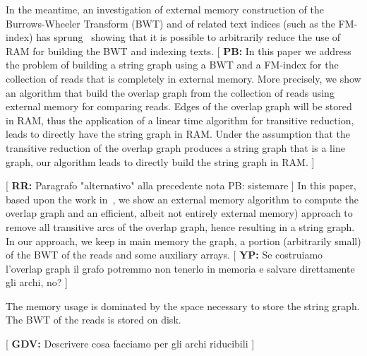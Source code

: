 \documentclass[runningheads,envcountsame,a4paper]{llncs}
\newcommand{\notaestesa}[2]{%
 \marginpar{\color{red!75!black}\textbf{\texttimes}}%
 {\color{red!75!black}%
 [\,\textbullet\,\textsf{\textbf{#1:}} %
 \textsf{\footnotesize#2}\,\textbullet\,]}%
}
\newcommand{\YP}[1]{\notaestesa{YP}{#1}}
\begin{document}
In the meantime, an investigation of external memory construction of the
Burrows-Wheeler Transform (BWT) and of related text indices (such as the
FM-index) has sprung~\cite{Bauer2011,Bauer2013,Ferragina2012} showing that it is possible to
arbitrarily reduce the use of RAM for building the BWT and indexing texts.
\notaestesa{PB}{In this paper we address the problem of 
building a string graph using a BWT and a FM-index for the collection of reads that is completely in  external  memory.
More precisely, we show an algorithm that  build  the overlap graph from the collection of reads using external memory for comparing reads.
Edges of the overlap graph will be stored in RAM, thus the application of a  linear time algorithm for transitive  reduction, leads  
to directly have the string graph in RAM.
Under the assumption that the transitive reduction of the overlap graph produces a string graph that is a line graph,  our algorithm 
leads to directly build the string graph in RAM.}

\notaestesa{RR}{Paragrafo "alternativo" alla precedente nota PB: sistemare} In this paper, based upon the work in~\cite{Bauer2011}, we show an external
memory algorithm to compute the overlap graph and an efficient, albeit not
entirely external memory) approach to remove all transitive arcs of the overlap
graph, hence resulting in a string graph.
%
%
In our approach, we keep in main memory the graph, a portion (arbitrarily small)
of the BWT of the reads and some auxiliary arrays.
\YP{Se costruiamo l'overlap graph il grafo potremmo non tenerlo in memoria e salvare direttamente gli archi, no?}
The memory usage is dominated by the space necessary to store the string graph.
The BWT of the reads is stored on disk.

\notaestesa{GDV}{ Descrivere cosa facciamo per gli archi riducibili}
\end{document}
